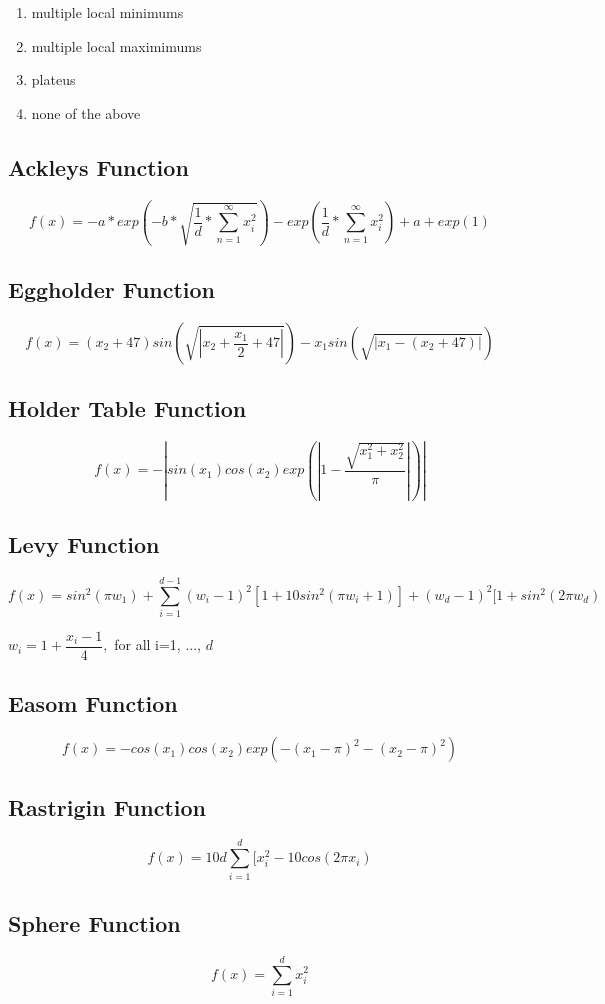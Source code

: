 \documentclass[twocolumn]{article}
\begin{document}
\begin{enumerate}

\item{multiple local minimums}

\item {multiple local maximimums}

\item {plateus}

\item {none of the above}

\end{enumerate}

\subsection{Ackleys Function}
$$f(x) = -a * exp (-b * \sqrt{\dfrac{1}{d}* \sum_{n=1}^{\infty} x_i^{2}}) - exp(\dfrac{1}{d} * \sum_{n=1}^{\infty} x_i^{2}) + a + exp(1)$$
\subsection{Eggholder Function}
$$f(x) =(x_2 + 47)sin(\sqrt{|x_2 + \dfrac{x_1}{2} + 47|})-x_1 sin ( \sqrt{|x_1-(x_2 + 47 )|})$$
\subsection{Holder Table Function}
$$f(x) = -|sin(x_1)cos(x_2)exp(|1-\dfrac{\sqrt{x_1^2 + x_2^2}}{\pi}|)|$$
\subsection{Levy Function}
$$f(x) = sin^2(\pi w_1)+ \sum_{i=1} ^{d-1}(w_i -1)^2[1+10sin^2(\pi w_i + 1)] + (w_d - 1)^2[1 + sin^2(2\pi w_d)$$

$w_i = 1 + \dfrac{x_i -1}{4},$ for all i=1, ..., $d$

\subsection{Easom Function}
$$f(x) = -cos(x_1)cos(x_2) exp(-(x_1 -\pi)^2-(x_2-\pi)^2)$$

\subsection{Rastrigin Function}
$$f(x) = 10d \sum_{i=1}^{d}[x_i^2 - 10 cos (2 \pi x_i)$$
\subsection{Sphere Function}
$$f(x) = \sum_{i=1}^{d} x_i^2$$
\end{document}
